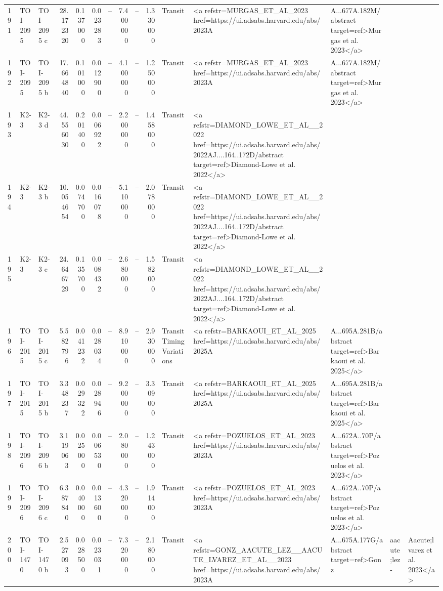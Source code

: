 \begin{tabular}{lllrrrrrrrll}
191 & TOI-2095 & TOI-2095 c & 28.172320 & 0.137000 & 0.023283 & -- & 7.400000 & -- & 1.330000 & Transit & <a refstr=MURGAS_ET_AL_2023 href=https://ui.adsabs.harvard.edu/abs/2023A&A...677A.182M/abstract target=ref>Murgas et al. 2023</a> \\
192 & TOI-2095 & TOI-2095 b & 17.664840 & 0.101000 & 0.012900 & -- & 4.100000 & -- & 1.250000 & Transit & <a refstr=MURGAS_ET_AL_2023 href=https://ui.adsabs.harvard.edu/abs/2023A&A...677A.182M/abstract target=ref>Murgas et al. 2023</a> \\
193 & K2-3 & K2-3 d & 44.556030 & 0.201400 & 0.006922 & -- & 2.200000 & -- & 1.458000 & Transit & <a refstr=DIAMOND_LOWE_ET_AL__2022 href=https://ui.adsabs.harvard.edu/abs/2022AJ....164..172D/abstract target=ref>Diamond-Lowe et al. 2022</a> \\
194 & K2-3 & K2-3 b & 10.054654 & 0.074700 & 0.016078 & -- & 5.110000 & -- & 2.078000 & Transit & <a refstr=DIAMOND_LOWE_ET_AL__2022 href=https://ui.adsabs.harvard.edu/abs/2022AJ....164..172D/abstract target=ref>Diamond-Lowe et al. 2022</a> \\
195 & K2-3 & K2-3 c & 24.646729 & 0.135700 & 0.008432 & -- & 2.680000 & -- & 1.582000 & Transit & <a refstr=DIAMOND_LOWE_ET_AL__2022 href=https://ui.adsabs.harvard.edu/abs/2022AJ....164..172D/abstract target=ref>Diamond-Lowe et al. 2022</a> \\
196 & TOI-2015 & TOI-2015 c & 5.582796 & 0.041232 & 0.028034 & -- & 8.910000 & -- & 2.930000 & Transit Timing Variations & <a refstr=BARKAOUI_ET_AL_2025 href=https://ui.adsabs.harvard.edu/abs/2025A&A...695A.281B/abstract target=ref>Barkaoui et al. 2025</a> \\
197 & TOI-2015 & TOI-2015 b & 3.348237 & 0.029322 & 0.028946 & -- & 9.200000 & -- & 3.309000 & Transit & <a refstr=BARKAOUI_ET_AL_2025 href=https://ui.adsabs.harvard.edu/abs/2025A&A...695A.281B/abstract target=ref>Barkaoui et al. 2025</a> \\
198 & TOI-2096 & TOI-2096 b & 3.119063 & 0.025000 & 0.006530 & -- & 2.080000 & -- & 1.243000 & Transit & <a refstr=POZUELOS_ET_AL_2023 href=https://ui.adsabs.harvard.edu/abs/2023A&A...672A..70P/abstract target=ref>Pozuelos et al. 2023</a> \\
199 & TOI-2096 & TOI-2096 c & 6.387840 & 0.040000 & 0.013600 & -- & 4.320000 & -- & 1.914000 & Transit & <a refstr=POZUELOS_ET_AL_2023 href=https://ui.adsabs.harvard.edu/abs/2023A&A...672A..70P/abstract target=ref>Pozuelos et al. 2023</a> \\
200 & TOI-1470 & TOI-1470 b & 2.527093 & 0.028500 & 0.023031 & -- & 7.320000 & -- & 2.180000 & Transit & <a refstr=GONZ_AACUTE_LEZ__AACUTE_LVAREZ_ET_AL__2023 href=https://ui.adsabs.harvard.edu/abs/2023A&A...675A.177G/abstract target=ref>Gonz&aacute;lez-&Aacute;lvarez et al. 2023</a> \\

\end{tabular}
